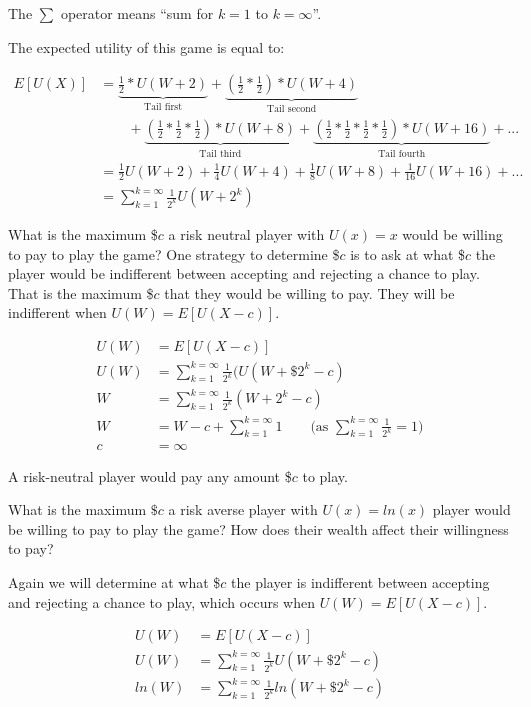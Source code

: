 \documentclass[
  letterpaper,
  DIV=11,
  numbers=noendperiod]{scrreprt}
\begin{document}
The \(\sum\) operator means ``sum for \(k=1\) to \(k=\infty\)''.

The expected utility of this game is equal to:

\begin{align*}
E[U(X)]&=\underbrace{\frac{1}{2}*U(W+2)}_\textrm{Tail first}+\underbrace{(\frac{1}{2}*\frac{1}{2})*U(W+4)}_\textrm{Tail second} \\[24pt] 
&\qquad +\underbrace{(\frac{1}{2}*\frac{1}{2}*\frac{1}{2})*U(W+8)}_\textrm{Tail third}
+\underbrace{(\frac{1}{2}*\frac{1}{2}*\frac{1}{2}*\frac{1}{2})*U(W+16)}_\textrm{Tail fourth}+... \\[24pt]
&=\frac{1}{2}U(W+2)+\frac{1}{4}U(W+4)+\frac{1}{8}U(W+8)+\frac{1}{16}U(W+16)+...  \\[12pt]
&=\sum_{k=1}^{k=\infty}\frac{1}{2^k}U(W+2^k)
\end{align*}

What is the maximum \$\(c\) a risk neutral player with \(U(x)=x\) would
be willing to pay to play the game? One strategy to determine \$\(c\) is
to ask at what \$\(c\) the player would be indifferent between accepting
and rejecting a chance to play. That is the maximum \$\(c\) that they
would be willing to pay. They will be indifferent when
\(U(W)=E[U(X-c)]\).

\begin{align*}
U(W)&=E[U(X-c)] \\[6pt]
U(W)&=\sum_{k=1}^{k=\infty}\frac{1}{2^k}(U(W+\$2^k-c) \\[6pt]
W&=\sum_{k=1}^{k=\infty}\frac{1}{2^k}(W+2^k-c) \\[6pt]
W&=W-c+\sum_{k=1}^{k=\infty}1 \qquad \bigg(\text{as }\sum_{k=1}^{k=\infty}\frac{1}{2^k}=1\bigg) \\[12pt]
c&=\infty
\end{align*}

A risk-neutral player would pay any amount \$\(c\) to play.

What is the maximum \(\$c\) a risk averse player with \(U(x)=ln(x)\)
player would be willing to pay to play the game? How does their wealth
affect their willingness to pay?

Again we will determine at what \$\(c\) the player is indifferent
between accepting and rejecting a chance to play, which occurs when
\(U(W)=E[U(X-c)]\).

\begin{align*}
U(W)&=E[U(X-c)] \\[6pt]
U(W)&=\sum_{k=1}^{k=\infty}\frac{1}{2^k}U(W+\$2^k-c) \\[6pt]
ln(W)&=\sum_{k=1}^{k=\infty}\frac{1}{2^k}ln(W+\$2^k-c)
\end{align*}
\end{document}
